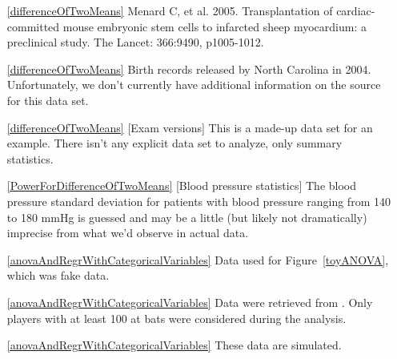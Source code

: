 \begin{itemize}
\item[\ref{differenceOfTwoMeans}]
        {Menard C, et al. 2005.
            Transplantation of cardiac-committed mouse
            embryonic
            stem cells to infarcted sheep myocardium:
            a preclinical study.
            The Lancet: 366:9490, p1005-1012.}
\item[\ref{differenceOfTwoMeans}]
    Birth records released by North Carolina in 2004.
    Unfortunately, we don't currently have additional
    information on the source for this data set.
\item[\ref{differenceOfTwoMeans}]
    [Exam versions]
    This is a made-up data set for an example.
    There isn't any explicit data set to analyze,
    only summary statistics.

\item[\ref{PowerForDifferenceOfTwoMeans}]
    [Blood pressure statistics]
    The blood pressure standard deviation for patients
    with blood pressure ranging from 140 to 180 mmHg
    is guessed and may be a little (but likely not dramatically)
    imprecise from what we'd observe in actual data.

\item[\ref{anovaAndRegrWithCategoricalVariables}]
    Data used for Figure~\ref{toyANOVA}, which was fake data.
\item[\ref{anovaAndRegrWithCategoricalVariables}]
    Data were retrieved from
    .
    Only players with at least 100 at bats were considered
    during the analysis.
\item[\ref{anovaAndRegrWithCategoricalVariables}]
    These data are simulated.

\end{itemize}






\section{}
\label{ch_regr_simple_linear_data}

